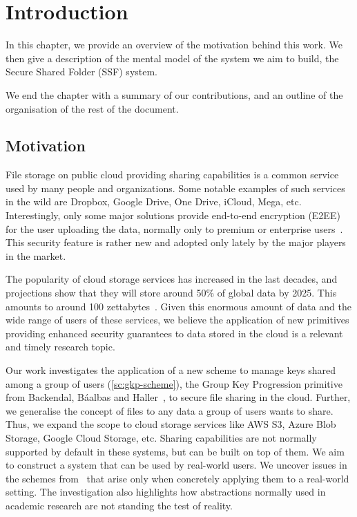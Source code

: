 \chapter{Introduction}
In this chapter, we provide an overview of the motivation
behind this work. 
We then give a
description of the mental model of the system we aim to build,
the Secure Shared Folder (SSF) system.

We end the chapter with a summary of our contributions,
and an outline of the organisation of the rest of the document.

\section{Motivation}\label{intro-motivation}

File storage on public cloud providing sharing capabilities is a common service used by many people and organizations.
Some notable examples of such services in the wild are Dropbox, Google Drive, One Drive, iCloud, Mega, etc.
Interestingly, only some major solutions provide end-to-end encryption (E2EE) for the user uploading 
the data, normally only to premium or enterprise users~\cite{Dropbox,googleWorkspaceE2EE,Apple,Mega}.
This security feature is rather new and adopted only lately by the major players in the market.

The popularity of cloud storage services has increased in the last decades,
and projections show that they will store around 50\% of global data by 2025.
This amounts to around 100 zettabytes~\cite{SteveMorgan}.
Given this enormous amount of data and the wide range of users of these services, 
we believe the application of new primitives providing enhanced security guarantees
to data stored in the cloud is a relevant and timely research topic.

Our work investigates the application of a new scheme
to manage keys shared among a group of users (\cref{sc:gkp-scheme}),
the Group Key Progression primitive from Backendal, B{\'a}albas and Haller~\cite{GKP}, 
to secure file sharing in the cloud. 
Further, we generalise the concept of files to any data a group of users wants to share.
Thus, we expand the scope to cloud storage services like AWS S3, Azure Blob Storage, Google Cloud Storage, etc.
Sharing capabilities are not normally supported by default in these systems, but can be built on top of them.
We aim to construct
a system that can be used by real-world users.
We uncover issues in the schemes from~\cite{GKP}
that arise only when concretely applying them
to a real-world setting. The investigation also
highlights how abstractions normally used in academic
research are not standing the test of reality.

